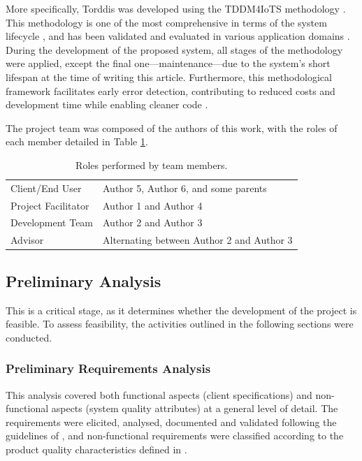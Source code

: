 		More specifically, Torddis was developed using the TDDM4IoTS methodology \citep{Guerrero-Ulloa2020TDDM4IoTS}. This methodology is one of the most comprehensive in terms of the system lifecycle \citep{Guerrero2023Agile}, and has been validated and evaluated in various application domains  \citep{Guerrero-Ulloa2020IoT, Guerrero-Ulloa2022Internet, Guerrero-Ulloa2023DevIdeAir, Guerrero-Ulloa2023SP4, Guerrero-Ulloa2023Nawi}. During the development of the proposed system, all stages of the methodology were applied, except the final one—maintenance—due to the system’s short lifespan at the time of writing this article. Furthermore, this methodological framework facilitates early error detection, contributing to reduced costs and development time while enabling cleaner code \citep{Beck2002TDD}.
		
		The project team was composed of the authors of this work, with the roles of each member detailed in Table \ref{tab:Roles}.
		
		\begin{table}[!htbp]
			\caption{Roles performed by team members.\label{tab:Roles}}
			\centering
			\begin{tabularx}{0.8\textwidth}{>{\raggedright\arraybackslash}X >{\raggedright\arraybackslash}X}
				\toprule
				\multicolumn{1}{c}{\textbf{Role}} & \multicolumn{1}{c}{\textbf{Member}} \\
				\midrule
				Client/End User & Author 5, Author 6, and some parents\\
				Project Facilitator & Author 1 and Author 4\\
				Development Team & Author 2 and Author 3\\
				Advisor & Alternating between Author 2 and Author 3\\
				\bottomrule
			\end{tabularx}
		\end{table}
		
		\subsection{Preliminary Analysis}
			This is a critical stage, as it determines whether the development of the project is feasible. To assess feasibility, the activities outlined in the following sections were conducted.
			
			\subsubsection{Preliminary Requirements Analysis}
				This analysis covered both functional aspects (client specifications) and non-functional aspects (system quality attributes) at a general level of detail. The requirements were elicited, analysed, documented and validated following the guidelines of \citet{ISO-IEC-IEEE29148-2018}, and non-functional requirements were classified according to the product quality characteristics defined in \citet{ISO-IEC25010-2023}.
				

